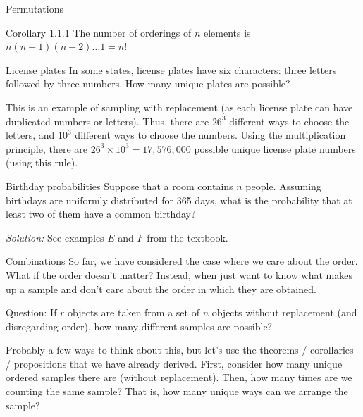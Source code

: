 \begin{frame}[allowframebreaks]{Permutations}
  \begin{block}{Corollary 1.1.1}
    The number of orderings of $n$ elements is $n(n-1)(n-2)\ldots 1 = n!$
  \end{block}
  
  \begin{exampleblock}{License plates}
    In some states, license plates have six characters: three letters followed by three numbers. How many unique plates are possible?
    
    This is an example of sampling with replacement (as each license plate can have duplicated numbers or letters). Thus, there are $26^3$ different ways to choose the letters, and $10^3$ different ways to choose the numbers. Using the multiplication principle, there are $26^3 \times 10^3 = 17,576,000$ possible unique license plate numbers (using this rule).
  \end{exampleblock}
  
  \begin{exampleblock}{Birthday probabilities}
    Suppose that a room contains $n$ people. Assuming birthdays are uniformly distributed for 365 days, what is the probability that at least two of them have a common birthday?
  \end{exampleblock}
  
  \emph{Solution:} See examples $E$ and $F$ from the textbook.
  
\end{frame}

\begin{frame}{Combinations}
  So far, we have considered the case where we care about the order. What if the order doesn't matter? Instead, when just want to know what makes up a sample and don't care about the order in which they are obtained. 
  
  \alert{Question}: If $r$ objects are taken from a set of $n$ objects without replacement (and disregarding order), how many different samples are possible?
  
  Probably a few ways to think about this, but let's use the theorems / corollaries / propositions that we have already derived.
  First, consider how many unique ordered samples there are (without replacement). Then, how many times are we counting the same sample? That is, how many unique ways can we arrange the sample?
  
\end{frame}

